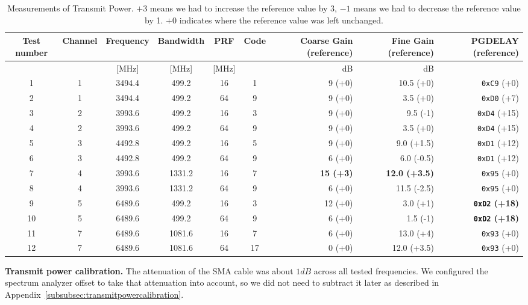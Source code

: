 \documentclass[journal,comsoc]{IEEEtran}
\begin{document}
\begin{table}[h!]
	\centering
	\begin{tabular}{|c|c|c|c|c|c|r|r|r|}
	\hline
	\textbf{Test number} & \textbf{Channel} & \textbf{Frequency} & \textbf{Bandwidth} & \textbf{PRF} & \textbf{Code} & \textbf{Coarse Gain (reference)} & \textbf{Fine Gain (reference)} & \textbf{PGDELAY (reference)}\\ \hline
	& & [MHz] & [MHz] & [MHz] & & dB & dB & \\\hline\hline
	 1 & 1 & 3494.4 & 499.2  & 16 & 1 & 9 (+0)& 10.5 (+0)& \texttt{0xC9} (+0) \\ \hline
  	 2 & 1 & 3494.4 & 499.2  & 64 & 9 & 9 (+0)& 3.5 (+0)& \texttt{0xD0} (+7) \\ \hline
	 3 & 2 & 3993.6 & 499.2  & 16 & 3 & 9 (+0)& 9.5 (-1) & \texttt{0xD4} (+15) \\ \hline
	 4 & 2 & 3993.6 & 499.2  & 64 & 9 & 9 (+0)& 3.5 (+0)& \texttt{0xD4} (+15) \\ \hline
	 5 & 3 & 4492.8 & 499.2  & 16 & 5 & 9 (+0)& 9.0 (+1.5)& \texttt{0xD1} (+12) \\ \hline
	 6 & 3 & 4492.8 & 499.2  & 64 & 9 & 6 (+0)& 6.0 (-0.5)& \texttt{0xD1} (+12)\\ \hline
	 7 & 4 & 3993.6 & 1331.2 & 16 & 7 &\textbf{15 (+3)}&\textbf{12.0 (+3.5)}& \texttt{0x95} (+0)\\ \hline
	 8 & 4 & 3993.6 & 1331.2 & 64 & 9 & 6 (+0)&11.5 (-2.5)& \texttt{0x95} (+0)\\ \hline
	 9 & 5 & 6489.6 & 499.2  & 16 & 3 &12 (+0)& 3.0 (+1)& \textbf{\texttt{0xD2} (+18)}\\ \hline
	10 & 5 & 6489.6 & 499.2  & 64 & 9 & 6 (+0)& 1.5 (-1)& \textbf{\texttt{0xD2} (+18)}\\ \hline
	11 & 7 & 6489.6 & 1081.6 & 16 & 7 & 6 (+0)&13.0 (+4)&  \texttt{0x93} (+0)\\ \hline
	12 & 7 & 6489.6 & 1081.6 & 64 &17 & 0 (+0)&12.0 (+3.5)& \texttt{0x93} (+0)\\ \hline
	\end{tabular}
	\caption{Measurements of Transmit Power. $+3$ means we had to increase the reference value by 3, $-1$ means we had to decrease the reference value by 1.
$+0$ indicates where the reference value was left unchanged.}
	\label{tab:resulttxpowermeasurements}
\end{table}
\vspace*{0.5em}
\noindent\textbf{Transmit power calibration.} The attenuation of the SMA cable was about $1dB$ across all tested frequencies.
We configured the spectrum analyzer offset to take that attenuation into account, so we did not need to subtract it later as described in Appendix~\ref{subsubsec:transmitpowercalibration}.
\end{document}

